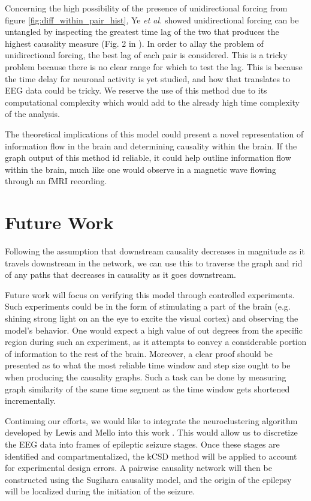 \documentclass[journal,12pt,onecolumn,draftclsnofoot]{IEEEtran}  %
\begin{document}
Concerning the high possibility of the presence of unidirectional forcing from figure \ref{fig:diff_within_pair_hist}, Ye \textit{et al.} showed unidirectional forcing can be untangled by inspecting the greatest time lag of the two that produces the highest causality measure (Fig. 2 in \cite{Ye2015}). In order to allay the problem of unidirectional forcing, the best lag of each pair is considered. This is a tricky problem because there is no clear range for which to test the lag. This is because the time delay for neuronal activity is yet studied, and how that translates to EEG data could be tricky. We reserve the use of this method due to its computational complexity which would add to the already high time complexity of the analysis.

The theoretical implications of this model could present a novel representation of information flow in the brain and determining causality within the brain. If the graph output of this method id reliable, it could help outline information flow within the brain, much like one would observe in a magnetic wave flowing through an fMRI recording. 



\section{Future Work}

Following the assumption that downstream causality decreases in magnitude as it travels downstream in the network, we can use this to traverse the graph and rid of any paths that decreases in causality as it goes downstream.

Future work will focus on verifying this model through controlled experiments. Such experiments could be in the form of stimulating a part of the brain (e.g. shining strong light on an the eye to excite the visual cortex) and observing the model's behavior. One would expect a high value of out degrees from the specific region during such an experiment, as it attempts to convey a considerable portion of information to the rest of the brain. Moreover, a clear proof should be presented as to what the most reliable time window and step size ought to be when producing the causality graphs. Such a task can be done by measuring graph similarity of the same time segment as the time window gets shortened incrementally.

Continuing our efforts, we would like to integrate the neuroclustering algorithm developed by Lewis and Mello into this work \cite{Lewis2012}. This would allow us to discretize the EEG data into frames of epileptic seizure stages. Once these stages are identified and compartmentalized, the kCSD method will be applied to account for experimental design errors. A pairwise causality network will then be constructed using the Sugihara causality model, and the origin of the epilepsy will be localized during the initiation of the seizure.
\end{document}
